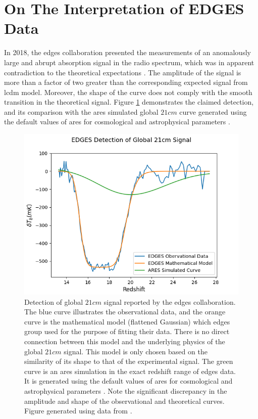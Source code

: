 \documentclass[12pt, TexShade, letterpaper]{report}
\begin{document}
\section{On The Interpretation of EDGES Data}
\label{chap:Observations,sub:edges_affair}
 In 2018, the \gls{edges} collaboration presented the measurements of an anomalously large and abrupt absorption signal in the radio spectrum, which was in apparent contradiction to the theoretical expectations \cite{edges}. The amplitude of the signal is more than a factor of two greater than the corresponding expected signal from \gls{lcdm} model. Moreover, the shape of the curve does not comply with the smooth transition in the theoretical signal. Figure \ref{fig:edges_data} demonstrates the claimed detection, and its comparison with the \gls{ares} simulated global $21cm$ curve generated using the default values of \gls{ares} for cosmological and astrophysical parameters \cite{ares_documentation}.\par
\begin{figure}[h!]
    \centering
    \includegraphics[scale= 0.75]{edges_data.png}
    \caption[Results of \gls{edges} Experiment]{Detection of global $21cm$ signal reported by the \gls{edges} collaboration. The blue curve illustrates the observational data, and the orange curve is the mathematical model (flattened Gaussian) which \gls{edges} group used for the purpose of fitting their data. There is no direct connection between this model and the underlying physics of the global $21cm$ signal. This model is only chosen based on the similarity of its shape to that of the experimental signal. The green curve is an \gls{ares} simulation in the exact redshift range of \gls{edges} data. It is generated using the default values of \gls{ares} for cosmological and astrophysical parameters \cite{ares_documentation}. Note the significant discrepancy in the amplitude and shape of the observational and theoretical curves. Figure generated using data from \cite{edges}.}
    \label{fig:edges_data}
\end{figure}
 
\end{document}
